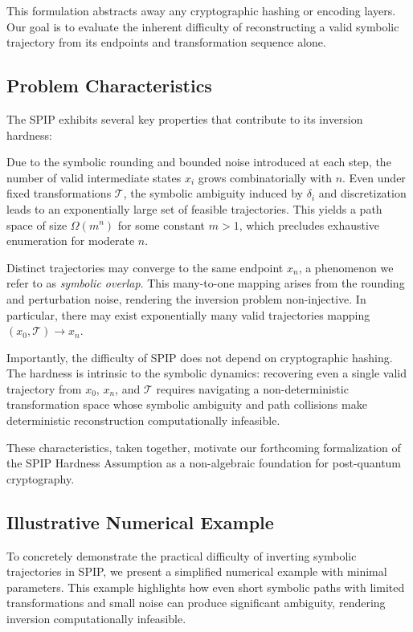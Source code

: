 \documentclass[twocolumn,10pt]{article}
\begin{document}
This formulation abstracts away any cryptographic hashing or encoding layers. Our goal is to evaluate the inherent difficulty of reconstructing a valid symbolic trajectory from its endpoints and transformation sequence alone.

\subsection{Problem Characteristics}

The SPIP exhibits several key properties that contribute to its inversion hardness:

Due to the symbolic rounding and bounded noise introduced at each step, the number of valid intermediate states $x_i$ grows combinatorially with $n$. Even under fixed transformations $\mathcal{T}$, the symbolic ambiguity induced by $\delta_i$ and discretization leads to an exponentially large set of feasible trajectories. This yields a path space of size $\Omega(m^n)$ for some constant $m > 1$, which precludes exhaustive enumeration for moderate $n$.

Distinct trajectories may converge to the same endpoint $x_n$, a phenomenon we refer to as \emph{symbolic overlap}. This many-to-one mapping arises from the rounding and perturbation noise, rendering the inversion problem non-injective. In particular, there may exist exponentially many valid trajectories mapping $(x_0, \mathcal{T}) \rightarrow x_n$.


Importantly, the difficulty of SPIP does not depend on cryptographic hashing. The hardness is intrinsic to the symbolic dynamics: recovering even a single valid trajectory from $x_0$, $x_n$, and $\mathcal{T}$ requires navigating a non-deterministic transformation space whose symbolic ambiguity and path collisions make deterministic reconstruction computationally infeasible.

These characteristics, taken together, motivate our forthcoming formalization of the SPIP Hardness Assumption as a non-algebraic foundation for post-quantum cryptography.

\subsection{Illustrative Numerical Example}

To concretely demonstrate the practical difficulty of inverting symbolic trajectories in SPIP, we present a simplified numerical example with minimal parameters. This example highlights how even short symbolic paths with limited transformations and small noise can produce significant ambiguity, rendering inversion computationally infeasible.
\end{document}
